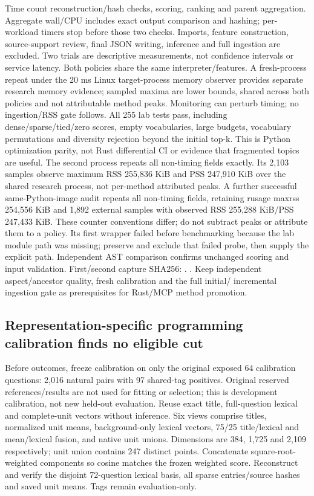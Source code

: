 \documentclass[11pt]{article}
\begin{document}
Time count reconstruction/hash checks, scoring, ranking and parent aggregation.
Aggregate wall/CPU includes exact output comparison and hashing; per-workload
timers stop before those two checks. Imports, feature construction, source-support
review, final JSON writing, inference and full ingestion are excluded. Two trials
are descriptive measurements, not confidence intervals or service latency.
Both policies share the same interpreter/features. A fresh-process repeat under
the 20 ms Linux target-process memory observer provides separate research memory
evidence; sampled maxima are lower bounds, shared across both policies and not
attributable method peaks. Monitoring can perturb timing; no ingestion/RSS gate
follows. All 255 lab tests pass, including dense/sparse/tied/zero scores, empty
vocabularies, large budgets, vocabulary permutations and diversity rejection
beyond the initial top-k. This is Python optimization parity, not Rust differential
CI or evidence that fragmented topics are useful. The second process repeats all
non-timing fields exactly. Its 2,103 samples observe maximum RSS 255,836 KiB and
PSS 247,910 KiB over the shared research process, not per-method attributed
peaks. A further successful same-Python-image audit repeats all non-timing fields,
retaining rusage maxrss 254,556 KiB and 1,892 external samples with observed RSS
255,288 KiB/PSS 247,433 KiB. These counter conventions differ; do not subtract
peaks or attribute them to a policy. Its first wrapper failed before benchmarking
because the lab module path was missing; preserve and exclude that failed probe,
then supply the explicit path. Independent AST comparison confirms unchanged
scoring and input validation. First/second capture SHA256:
.
.
Keep independent aspect/ancestor quality, fresh calibration and the full initial/
incremental ingestion gate as prerequisites for Rust/MCP method promotion.

\subsection{Representation-specific programming calibration finds no eligible cut}
Before outcomes, freeze calibration on only the original exposed 64 calibration
questions: 2,016 natural pairs with 97 shared-tag positives. Original reserved
references/results are not used for fitting or selection; this is development
calibration, not new held-out evaluation. Reuse exact title, full-question lexical
and complete-unit vectors without inference. Six views comprise titles, normalized
unit means, background-only lexical vectors, 75/25 title/lexical and mean/lexical
fusion, and native unit unions. Dimensions are 384, 1,725 and 2,109 respectively;
unit union contains 247 distinct points. Concatenate square-root-weighted
components so cosine matches the frozen weighted score. Reconstruct and verify
the disjoint 72-question lexical basis, all sparse entries/source hashes and
saved unit means. Tags remain evaluation-only.
\end{document}
